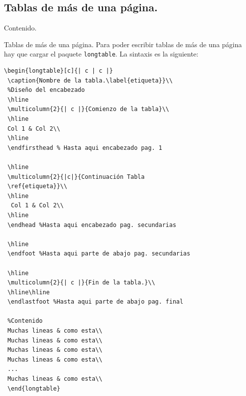 \documentclass[dvipsnames,xcolor, handout]{beamer}
\theoremstyle{plain}
\theoremstyle{definition}
\begin{document}
\subsection{Tablas de más de una página.}
\begin{frame}{Contenido.}
\begin{multicols}{2}
  \tableofcontents[currentsubsection]
\end{multicols}
\end{frame}

\begin{frame}[fragile]{Tablas de más de una página.}
    Para poder escribir tablas de más de una página hay que cargar el paquete \verb!longtable!. La sintaxis es la siguiente:\\\pause
\begin{multicols}{2}
\begin{tiny}
\begin{verbatim}
\begin{longtable}[c]{| c | c |}
 \caption{Nombre de la tabla.\label{etiqueta}}\\
 %Diseño del encabezado
 \hline
 \multicolumn{2}{| c |}{Comienzo de la tabla}\\
 \hline
 Col 1 & Col 2\\
 \hline
 \endfirsthead % Hasta aqui encabezado pag. 1
 
 \hline
 \multicolumn{2}{|c|}{Continuación Tabla
 \ref{etiqueta}}\\
 \hline
  Col 1 & Col 2\\
 \hline
 \endhead %Hasta aqui encabezado pag. secundarias
 
 \hline
 \endfoot %Hasta aqui parte de abajo pag. secundarias
  
 \hline
 \multicolumn{2}{| c |}{Fin de la tabla.}\\
 \hline\hline
 \endlastfoot %Hasta aqui parte de abajo pag. final
 
 %Contenido
 Muchas lineas & como esta\\
 Muchas lineas & como esta\\
 Muchas lineas & como esta\\
 Muchas lineas & como esta\\
 ...
 Muchas lineas & como esta\\
 \end{longtable}
 \end{verbatim}
 \end{tiny}
 \end{multicols}
\end{frame}
\end{document}
